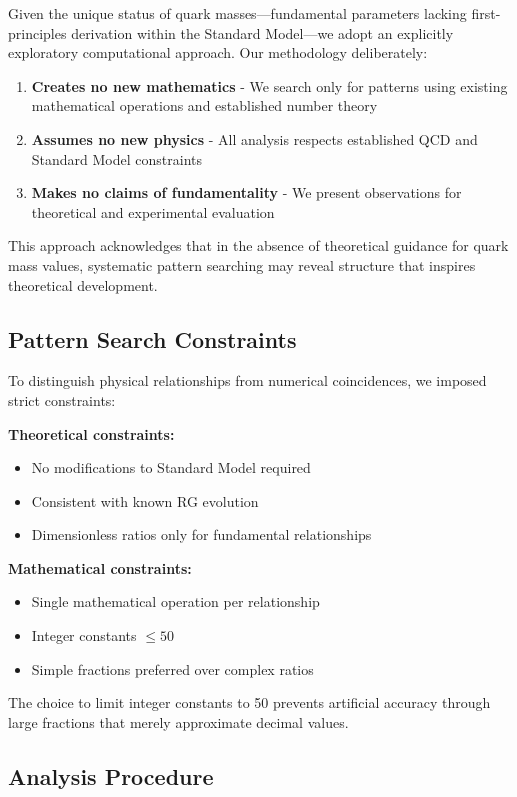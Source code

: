 \documentclass[12pt]{article}
\begin{document}
Given the unique status of quark masses—fundamental parameters lacking first-principles derivation within the Standard Model—we adopt an explicitly exploratory computational approach. Our methodology deliberately:

\begin{enumerate}
\item \textbf{Creates no new mathematics} - We search only for patterns using existing mathematical operations and established number theory
\item \textbf{Assumes no new physics} - All analysis respects established QCD and Standard Model constraints
\item \textbf{Makes no claims of fundamentality} - We present observations for theoretical and experimental evaluation
\end{enumerate}

This approach acknowledges that in the absence of theoretical guidance for quark mass values, systematic pattern searching may reveal structure that inspires theoretical development.

\subsection{Pattern Search Constraints}

To distinguish physical relationships from numerical coincidences, we imposed strict constraints:

\textbf{Theoretical constraints:}
\begin{itemize}
\item No modifications to Standard Model required
\item Consistent with known RG evolution
\item Dimensionless ratios only for fundamental relationships
\end{itemize}

\textbf{Mathematical constraints:}
\begin{itemize}
\item Single mathematical operation per relationship
\item Integer constants $\leq 50$
\item Simple fractions preferred over complex ratios
\end{itemize}

The choice to limit integer constants to 50 prevents artificial accuracy through large fractions that merely approximate decimal values.

\subsection{Analysis Procedure}
\end{document}
